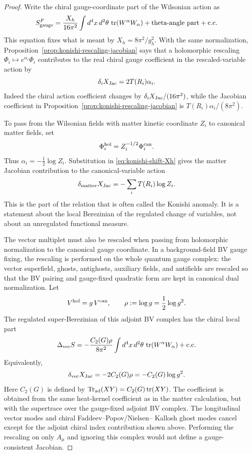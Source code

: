 \begin{proof}
Write the chiral gauge-coordinate part of the Wilsonian action as
\[
  S_{\rm gauge}^{F}
  =
  \frac{X_h}{16\pi^2}
  \int d^4x\,d^2\theta\,
  \operatorname{tr}(W^\alpha W_\alpha)
  +\text{theta-angle part}+\text{c.c.}
\]
This equation fixes what is meant by \(X_h=8\pi^2/g_h^2\).  With the same
normalization, Proposition~\ref{prop:konishi-rescaling-jacobian} says that a
holomorphic rescaling \(\Phi_i\mapsto e^{\alpha_i}\Phi_i\) contributes to the
real chiral gauge coefficient in the rescaled-variable action by
\begin{equation}
  \delta_i X_{\rm Jac}=2T(R_i)\alpha_i .
  \label{eq:konishi-shift-Xh}
\end{equation}
Indeed the chiral action coefficient changes by
\(\delta_i X_{\rm Jac}/(16\pi^2)\), while the Jacobian coefficient in
Proposition~\ref{prop:konishi-rescaling-jacobian} is
\(T(R_i)\alpha_i/(8\pi^2)\).

To pass from the Wilsonian fields with matter kinetic coordinate \(Z_i\) to
canonical matter fields, set
\[
  \Phi_i^{\rm hol}=Z_i^{-1/2}\Phi_i^{\rm can}.
\]
Thus \(\alpha_i=-\frac12\log Z_i\).  Substitution in
\eqref{eq:konishi-shift-Xh} gives the matter Jacobian contribution to the
canonical-variable action
\begin{equation}
  \delta_{\rm matter}X_{\rm Jac}
  =
  -\sum_iT(R_i)\log Z_i .
  \label{eq:matter-rescaling-shift-Xh}
\end{equation}
This is the part of the relation that is often called the Konishi anomaly.
It is a statement about the local Berezinian of the regulated change of
variables, not about an unregulated functional measure.

The vector multiplet must also be rescaled when passing from holomorphic
normalization to the canonical gauge coordinate.  In a background-field BV
gauge fixing, the rescaling is performed on the whole quantum gauge complex:
the vector superfield, ghosts, antighosts, auxiliary fields, and antifields
are rescaled so that the BV pairing and gauge-fixed quadratic form are kept
in canonical dual normalization.  Let
\[
  V^{\rm hol}=g\,V^{\rm can},
  \qquad
  \rho:=\log g=\frac12\log g^2 .
\]
The regulated super-Berezinian of this adjoint BV complex has the chiral
local part
\[
  \Delta_{\rm vec}S
  =
  -\frac{C_2(G)\rho}{8\pi^2}
  \int d^4x\,d^2\theta\,
  \operatorname{tr}(W^\alpha W_\alpha)
  +\text{c.c.}
\]
Equivalently,
\begin{equation}
  \delta_{\rm vec}X_{\rm Jac}
  =
  -2C_2(G)\rho
  =
  -C_2(G)\log g^2 .
  \label{eq:gauge-multiplet-rescaling-shift-Xh}
\end{equation}
Here \(C_2(G)\) is defined by
\(\operatorname{Tr}_{\rm ad}(XY)=C_2(G)\operatorname{tr}(XY)\).  The
coefficient is obtained from the same heat-kernel coefficient as in the
matter calculation, but with the supertrace over the gauge-fixed adjoint BV
complex.  The longitudinal vector modes and chiral Faddeev--Popov/Nielsen--
Kallosh ghost modes cancel except for the adjoint chiral index contribution
shown above.  Performing the rescaling on only \(A_\mu\) and ignoring this
complex would not define a gauge-consistent Jacobian.


\end{proof}
